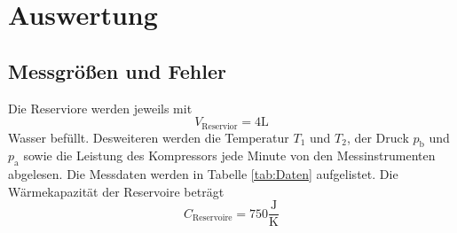 \section{Auswertung}
\label{sec:Auswertung}
\subsection{Messgrößen und Fehler}
Die Reserviore werden jeweils mit
\begin{equation}
  V_{\text{Reservior}} = 4 \text{L}
  \label{eqn:v}
\end{equation}
Wasser befüllt. Desweiteren werden die Temperatur $T_\text{1}$ und $T_\text{2}$, der Druck $p_{\text{b}}$ und $p_{\text{a}}$ sowie die Leistung des Kompressors jede Minute von den Messinstrumenten abgelesen. Die Messdaten werden in Tabelle \ref{tab:Daten} aufgelistet. Die Wärmekapazität der Reservoire beträgt
\begin{equation}
  C_{\text{Reservoire}} = 750 \frac{\text{J}}{\text{K}}
  \label{eqn:c_re}
\end{equation}

